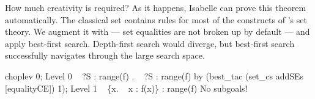 How much creativity is required?  As it happens, Isabelle can prove this
theorem automatically.  The classical set  contains rules
for most of the constructs of {\HOL}'s set theory.  We augment it with
 --- set equalities are not broken up by default ---
and apply best-first search.  Depth-first search would diverge, but
best-first search successfully navigates through the large search space.
\begin{ttbox}
choplev 0;
{\out Level 0}
{\out ~ ?S : range(f)}
{. ~ ?S : range(f)}
by (best_tac (set_cs addSEs [equalityCE]) 1);
{\out Level 1}
{\out ~ \{x. ~ x : f(x)\} : range(f)}
{\out No subgoals!}
\end{ttbox}
